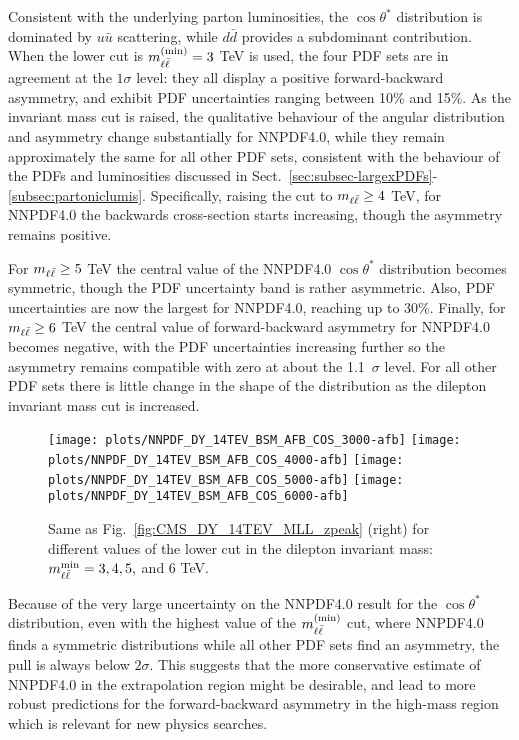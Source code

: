  Consistent with the underlying parton luminosities, the $\cos\theta^*$ distribution
 is dominated by $u\bar{u}$ scattering, while  $d\bar{d}$ provides
 a subdominant contribution.
 When the lower cut  is $m_{\ell\bar{\ell}}^{(\rm min)}=3$ TeV is used, the four PDF
 sets are in agreement at the $1\sigma$ level: they all
 display a 
 positive forward-backward asymmetry, and exhibit PDF uncertainties ranging between 10\% and 15\%.
 As the invariant mass cut is raised, the qualitative behaviour of the
 angular distribution and
 asymmetry change substantially for NNPDF4.0, while they remain
 approximately the same for all other PDF sets, consistent with the
 behaviour of the PDFs and luminosities discussed in
 Sect.~\ref{sec:subsec-largexPDFs}-\ref{subsec:partoniclumis}.
%
 Specifically,
 raising the cut to
 $m_{\ell\bar{\ell}} \ge 4$ TeV, for NNPDF4.0
 the backwards cross-section starts increasing, though the asymmetry remains
positive.

For $m_{\ell\bar{\ell}}\ge 5$ TeV the central value of the NNPDF4.0 $\cos\theta^*$
 distribution  becomes symmetric, though the  PDF uncertainty band is
 rather asymmetric. Also, PDF uncertainties
 are now the largest for NNPDF4.0, reaching up to 30\%.
 Finally, for $m_{\ell\bar{\ell}}\ge 6$ TeV  the central value of 
 forward-backward asymmetry for NNPDF4.0 becomes negative, with the
 PDF uncertainties increasing further so the asymmetry remains compatible
 with zero at about the 1.1~$\sigma$ level.
 For all other PDF sets there is little change in the shape of the distribution as the
 dilepton invariant mass cut is increased.

\begin{figure}[t!]
 \centering
 \texttt{[image: plots/NNPDF\_DY\_14TEV\_BSM\_AFB\_COS\_3000-afb]}
 \texttt{[image: plots/NNPDF\_DY\_14TEV\_BSM\_AFB\_COS\_4000-afb]}
 \texttt{[image: plots/NNPDF\_DY\_14TEV\_BSM\_AFB\_COS\_5000-afb]}
 \texttt{[image: plots/NNPDF\_DY\_14TEV\_BSM\_AFB\_COS\_6000-afb]}
 \caption{Same as Fig.~\ref{fig:CMS_DY_14TEV_MLL_zpeak} (right)
   for different values of the  lower cut in the dilepton
   invariant mass: $m_{\ell\bar{\ell}}^{\rm min}=3, 4,5,$ and 6 TeV.
  }    
 \label{fig:CMS_DY_14TEV_MLL_others_asy}
\end{figure}

Because of the very large uncertainty on the NNPDF4.0 result for the $\cos\theta^*$
distribution, even with
the highest value of the  $m_{\ell\bar{\ell}}^{(\rm  min)}$ cut, where NNPDF4.0 finds a
symmetric distributions while all other PDF sets find an asymmetry,
the pull is always below $2 \sigma$.
%
This suggests that the more
conservative estimate of  NNPDF4.0 in the extrapolation region might be
desirable, and lead to more robust predictions for the
forward-backward asymmetry in the high-mass region which is relevant
for new physics searches.

